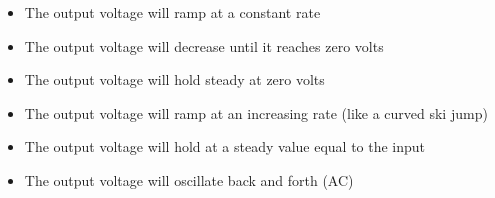 \begin{itemize}
\item{} The output voltage will ramp at a constant rate
\vskip 5pt 
\item{} The output voltage will decrease until it reaches zero volts
\vskip 5pt 
\item{} The output voltage will hold steady at zero volts 
\vskip 5pt 
\item{} The output voltage will ramp at an increasing rate (like a curved ski jump)
\vskip 5pt 
\item{} The output voltage will hold at a steady value equal to the input
\vskip 5pt 
\item{} The output voltage will oscillate back and forth (AC)
\end{itemize}





